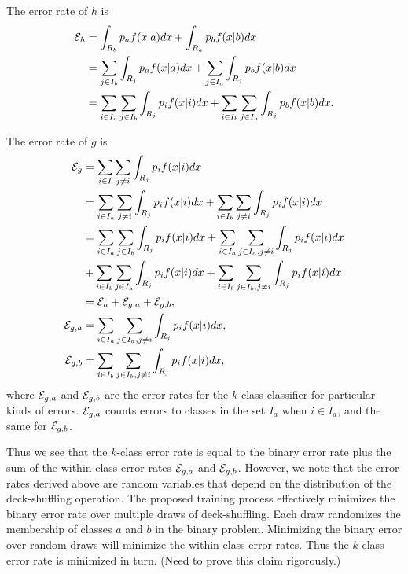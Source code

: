 \documentclass{article}
\begin{document}
The error rate of $h$ is
\begin{align*}
{\cal E}_h &= \int_{R_b} p_a f(x|a) dx + \int_{R_a} p_b f(x|b) dx \\
&= \sum_{j \in I_b} \int_{R_j} p_a f(x|a) dx + \sum_{j\in I_a} \int_{R_j} p_b f(x|b) dx \\
&= \sum_{i \in I_a} \sum_{j \in I_b} \int_{R_j} p_i f(x|i) dx + \sum_{i \in I_b} \sum_{j \in I_a} \int_{R_j} p_b f(x|b) dx.
\end{align*}

The error rate of $g$ is
\begin{align*}
{\cal E}_g &= \sum_{i \in I} \sum_{j\neq i} \int_{R_j} p_i f(x|i) dx \\
&= \sum_{i \in I_a} \sum_{j \neq i} \int_{R_j} p_i f(x|i) dx + \sum_{i \in I_b} \sum_{j \neq i} \int_{R_j} p_i f(x|i) dx\\
&= \sum_{i \in I_a} \sum_{j \in I_b} \int_{R_j} p_i f(x|i) dx + \sum_{i \in I_a} \sum_{j \in I_a, j\neq i} \int_{R_j} p_i f(x|i) dx \\
&+ \sum_{i \in I_b} \sum_{j \in I_a} \int_{R_j} p_i f(x|i) dx + \sum_{i \in I_b} \sum_{j \in I_b, j\neq i} \int_{R_j} p_i f(x|i) dx\\
&= {\cal E}_h + {\cal E}_{g,a} + {\cal E}_{g,b}, \\
{\cal E}_{g,a} &= \sum_{i \in I_a} \sum_{j \in I_a, j\neq i} \int_{R_j} p_i f(x|i) dx,\\
{\cal E}_{g,b} &= \sum_{i \in I_b} \sum_{j \in I_b, j\neq i} \int_{R_j} p_i f(x|i) dx,
\end{align*}
where ${\cal E}_{g,a}$ and ${\cal E}_{g,b}$ are the error rates for the $k$-class classifier for particular kinds of errors.  ${\cal E}_{g,a}$ counts errors to classes in the set $I_a$ when $i \in I_a$, and the same for ${\cal E}_{g,b}$.  

Thus we see that the $k$-class error rate is equal to the binary error rate plus the sum of the within class error rates ${\cal E}_{g,a}$ and ${\cal E}_{g,b}$.  However, we note that the error rates derived above are random variables that depend on the distribution of the deck-shuffling operation.  The proposed training process effectively minimizes the binary error rate over multiple draws of deck-shuffling.  Each draw randomizes the membership of classes $a$ and $b$ in the binary problem.  Minimizing the binary error over random draws will minimize the within class error rates.  Thus the $k$-class error rate is minimized in turn. (Need to prove this claim rigorously.)
\end{document}
